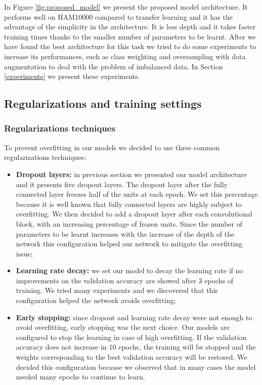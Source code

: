 		In Figure \ref{fig:proposed_model} we present the proposed model architecture. It performs well on HAM10000 compared to transfer learning and it has the advantage of the simplicity in the architecture. It is less depth and it takes faster training times thanks to the smaller number of parameters to be learnt. 
		After we have found the best architecture for this task we tried to do some experiments to increase its performances, such as class weighting and oversampling with data augmentation to deal with the problem of imbalanced data. In Section \ref{experiments} we present these experiments.
	
	\subsection{Regularizations and training settings}
	
		\subsubsection{Regularizations techniques} \label{regularization_techniques}
		
			To prevent overfitting in our models we decided to use three common regularizations techniques:
			
			\begin{itemize}
				\item \textbf{Dropout layers:} in previous section we presented our model architecture and it presents five dropout layers. The dropout layer after the fully connected layer freezes half of the units at each epoch. We set this percentage because it is well known that fully connected layers are highly subject to overfitting. We then decided to add a dropout layer after each convolutional block, with an increasing percentage of frozen units. Since the number of parameters to be learnt increases with the increase of the depth of the network this configuration helped our network to mitigate the overfitting issue;
				\item \textbf{Learning rate decay:} we set our model to decay the learning rate if no improvements on the validation accuracy are showed after 3 epochs of training. We tried many experiments and we discovered that this configuration helped the network avoids overfitting;
				\item \textbf{Early stopping:} since dropout and learning rate decay were not enough to avoid overfitting, early stopping was the next choice. Our models are configured to stop the learning in case of high overfitting. If the validation accuracy does not increase in 10 epochs, the training will be stopped and the weights corresponding to the best validation accuracy will be restored. We decided this configuration because we observed that in many cases the model needed many epochs to continue to learn.
			\end{itemize}
		
